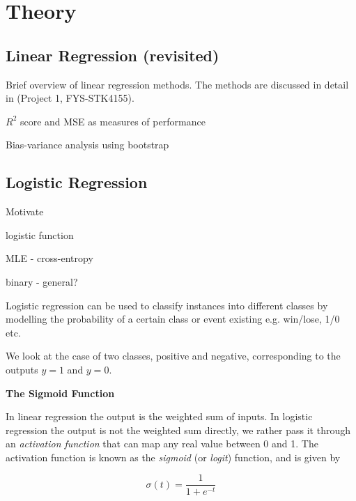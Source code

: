 \section{Theory}\label{sec:Theory}

\subsection{Linear Regression (revisited)}\label{sec:linreg theory}
Brief overview of linear regression methods. The methods are discussed in detail in (Project 1, FYS-STK4155).

$R^2$ score and MSE as measures of performance

Bias-variance analysis using bootstrap
\subsection{Logistic Regression}\label{sec:logreg theory}
Motivate

logistic function

MLE - cross-entropy

binary - general?

Logistic regression can be used to classify instances into different classes by modelling the probability of a certain class or event existing e.g. win/lose, 1/0 etc. 

We look at the case of two classes, positive and negative, corresponding to the outputs $y=1$ and $y=0$.

\textbf{The Sigmoid Function}

In linear regression the output is the weighted sum of inputs. In logistic regression the output is not the weighted sum directly, we rather pass it through an \textit{activation function} that can map any real value between 0 and 1. The activation function is known as the \textit{sigmoid} (or \textit{logit}) function, and is given by

\begin{equation}\label{eq:sigmoid_func}
    \sigma (t) = \frac{1}{1+ e^{-t}}
\end{equation}

